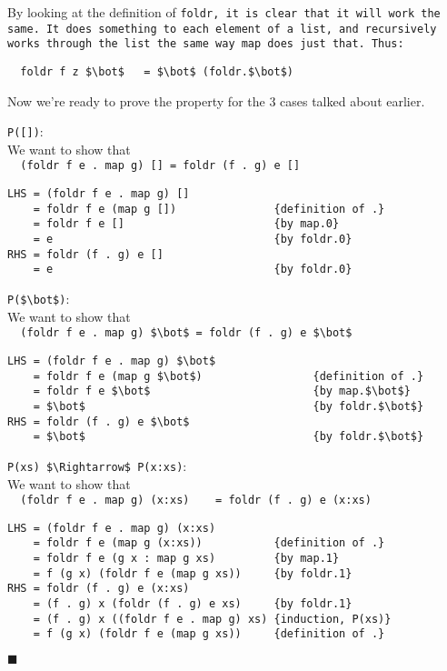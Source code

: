 \documentclass{article}
\begin{document}
\noindent By looking at the definition of \tt foldr\rm, it is clear that it will work the same.
It does something to each element of a list, and recursively works through the list
the same way map does just that.
Thus:
\begin{lstlisting}
  foldr f z $\bot$   = $\bot$ (foldr.$\bot$)
\end{lstlisting}

\noindent Now we're ready to prove the property for the 3 cases talked about earlier.\\

\pagebreak

\indent \lstinline{P([])}:\\
We want to show that\\ \lstinline{  (foldr f e . map g) [] = foldr (f . g) e []}
\begin{lstlisting}
LHS = (foldr f e . map g) []
    = foldr f e (map g [])               {definition of .}
    = foldr f e []                       {by map.0}
    = e                                  {by foldr.0}
RHS = foldr (f . g) e []
    = e                                  {by foldr.0}
\end{lstlisting}


\indent \lstinline{P($\bot$)}:\\
We want to show that\\ 
\lstinline{  (foldr f e . map g) $\bot$ = foldr (f . g) e $\bot$}
\begin{lstlisting}
LHS = (foldr f e . map g) $\bot$
    = foldr f e (map g $\bot$)                 {definition of .}
    = foldr f e $\bot$                         {by map.$\bot$}
    = $\bot$                                   {by foldr.$\bot$}
RHS = foldr (f . g) e $\bot$
    = $\bot$                                   {by foldr.$\bot$}
\end{lstlisting}

\indent \lstinline{P(xs) $\Rightarrow$ P(x:xs)}:\\
We want to show that\\
\lstinline{  (foldr f e . map g) (x:xs)    = foldr (f . g) e (x:xs)}
\begin{lstlisting}
LHS = (foldr f e . map g) (x:xs)
    = foldr f e (map g (x:xs))           {definition of .}
    = foldr f e (g x : map g xs)         {by map.1}
    = f (g x) (foldr f e (map g xs))     {by foldr.1}
RHS = foldr (f . g) e (x:xs)
    = (f . g) x (foldr (f . g) e xs)     {by foldr.1}
    = (f . g) x ((foldr f e . map g) xs) {induction, P(xs)}
    = f (g x) (foldr f e (map g xs))     {definition of .}
\end{lstlisting}
$\blacksquare$
\end{document}
